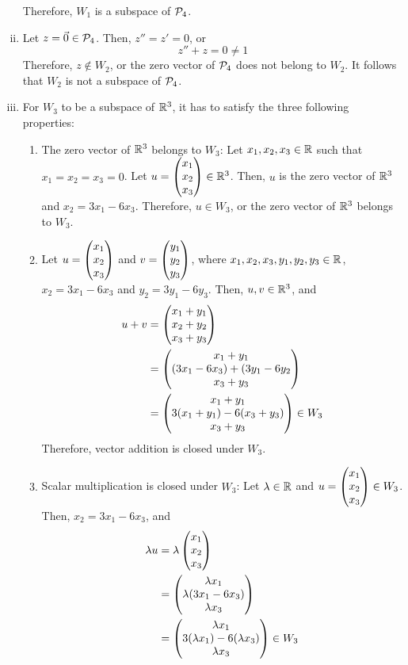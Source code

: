 \begin{sol}
\begin{enumerate}[(i)]
\begin{enumerate}[(1)]
              \end{enumerate}
              Therefore, $W_1$ is a subspace of $\P_4$.
        \item Let $z=\Vec{0}\in\P_4$. Then, $z''=z'=0$, or
              \[
                  z''+z=0\not=1
              \]
              Therefore, $z\not\in W_2$, or the zero vector of $\P_4$ does not belong to $W_2$. It follows that $W_2$ is not a subspace of $\P_4$.
        \item For $W_3$ to be a subspace of $\R^{3}$, it has to satisfy the three following properties:
              \begin{enumerate}[(1)]
                  \item The zero vector of $\R^{3}$ belongs to $W_3$: Let $x_1,x_2,x_3\in\R$ such that $x_1=x_2=x_3=0$. Let $u=\colvecthree{x_1}{x_2}{x_3}\in\R^{3}$. Then, $u$ is the zero vector of $\R^{3}$ and $x_2=3x_1-6x_3$. Therefore, $u\in W_3$, or the zero vector of $\R^{3}$ belongs to $W_3$.
                  \item Let $u=\colvecthree{x_1}{x_2}{x_3}$ and $v=\colvecthree{y_1}{y_2}{y_3}$, where $x_1,x_2,x_3,y_1,y_2,y_3\in\R$, $x_2=3x_1-6x_3$ and $y_2=3y_1-6y_3$. Then, $u,v\in\R^{3}$, and
                        \[
                            \begin{aligned}
                                u+v & = \colvecthree{x_1+y_1}{x_2+y_2}{x_3+y_3}                      \\
                                    & = \colvecthree{x_1+y_1}{(3x_1-6x_3)+(3y_1-6y_2}{x_3+y_3}       \\
                                    & = \colvecthree{x_1+y_1}{3(x_1+y_1)-6(x_3+y_3)}{x_3+y_3}\in W_3
                            \end{aligned}
                        \]
                        Therefore, vector addition is closed under $W_3$.
                  \item Scalar multiplication is closed under $W_3$: Let $\lam\in\R$ and $u=\colvecthree{x_1}{x_2}{x_3}\in W_3$. Then, $x_2=3x_1-6x_3$, and
                        \[
                            \begin{aligned}
                                \lam u & = \lam\colvecthree{x_1}{x_2}{x_3}                                  \\
                                       & = \colvecthree{\lam x_1}{\lam (3x_1-6x_3)}{\lam x_3}               \\
                                       & = \colvecthree{\lam x_1}{3(\lam x_1)-6(\lam x_3)}{\lam x_3}\in W_3

\end{aligned}\]
\end{enumerate}
\end{enumerate}
\end{sol}
